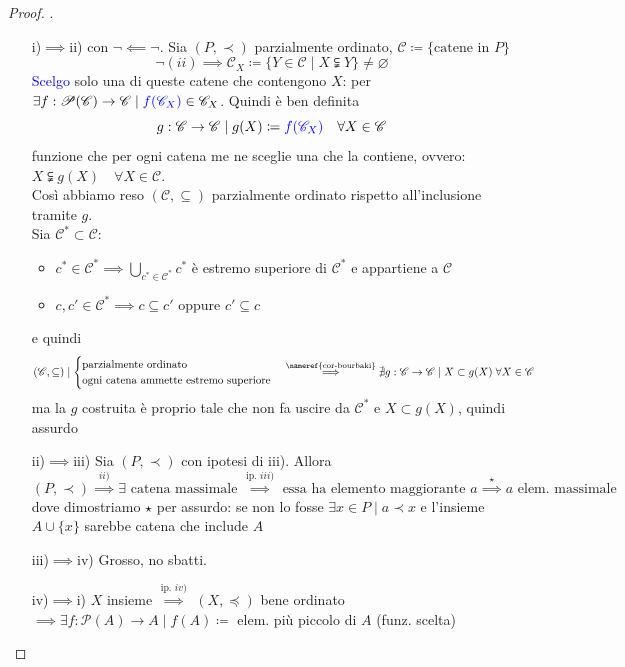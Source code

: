 \documentclass[a4paper,10pt]{article}
\theoremstyle{definition}
\theoremstyle{indentdefinition}
\theoremstyle{indentpostulate}
\theoremstyle{indenttheorem}
\theoremstyle{myremark}
\theoremstyle{indentgeneral}
\begin{document}
\begin{proof}.
\begin{itemize}
    \item[i)$\implies$ii)] con  $\neg\impliedby\neg$. Sia $(P,\prec)$ parzialmente ordinato, $\mathscr{C}\coloneqq\{\text{catene in }P\}$
    $$\neg (ii)\implies \mathscr{C}_X\coloneqq\{Y\in\mathscr{C}\mid X\subsetneqq Y\}\ne \varnothing$$
    \textcolor{blue}{Scelgo} solo una di queste catene che contengono $X$: per  $\exists  f: \mathscr{P}(\mathscr{C})\to \mathscr{C}\mid \textcolor{blue}{f(\mathscr{C}_X)}\in\mathscr{C}_X$. Quindi è ben definita
    $$g:\mathscr{C}\to \mathscr{C}\mid g(X)\coloneqq \textcolor{blue}{f(\mathscr{C}_X)} \quad \forall X\in \mathscr{C}$$
    funzione che per ogni catena me ne sceglie una che la contiene, ovvero: $X\subsetneqq g(X)\quad\forall X\in\mathscr{C}$. \\Così abbiamo reso $(\mathscr{C},\subseteq)$ parzialmente ordinato rispetto all'inclusione tramite $g$. \\Sia $\mathscr{C}^*\subset\mathscr{C}$:
    \begin{itemize}
        \item $c^*\in\mathscr{C}^*\implies \bigcup_{c^*\in\mathscr{C}^*}c^*$ è estremo superiore di $\mathscr{C}^*$ e appartiene  a $\mathscr{C}$
        \item $c,c'\in\mathscr{C}^*\implies c\subseteq c'$ oppure $c'\subseteq c$
    \end{itemize}
    e quindi 
    $$(\mathscr{C},\subseteq)\mid\begin{cases}
    \text{parzialmente ordinato}\\
    \text{ogni catena ammette estremo superiore}
\end{cases}\overset{\text{\nameref{cor-bourbaki}}}{\implies} \nexists g:\mathscr{C}\to \mathscr{C}\mid X\subset g(X)\;\forall X\in \mathscr{C}$$
    ma la $g$ costruita è proprio tale che non fa uscire da $\mathscr{C}^*$ e $X\subset g(X)$, quindi assurdo \lightning
    \item[ii)$\implies$iii)] Sia $(P,\prec)$ con ipotesi di iii). Allora
$$(P,\prec)\overset{ii)}{\implies}\exists\text{ catena massimale }\overset{\text{ip. }iii)}{\implies} \text{ essa ha elemento maggiorante } a\overset{\star}{\implies}a\text{ elem. massimale}$$
dove dimostriamo $\star$ per assurdo: se non lo fosse $\exists x\in P\mid a\prec x$ e l'insieme $A\cup\{x\}$ sarebbe catena che include $A$ \lightning

    \item[iii)$\implies$iv)] Grosso, no sbatti. 
    
    \item[iv)$\implies$i)] $X$ insieme $\overset{\text{ip. }iv)}{\implies}$ $(X,\preceq)$ bene ordinato $\implies\exists f:\mathscr{P}(A)\to A\mid f(A)\coloneqq$ elem. più piccolo di $A$ (funz. scelta)
\end{itemize}
    
\end{proof}
\end{document}
